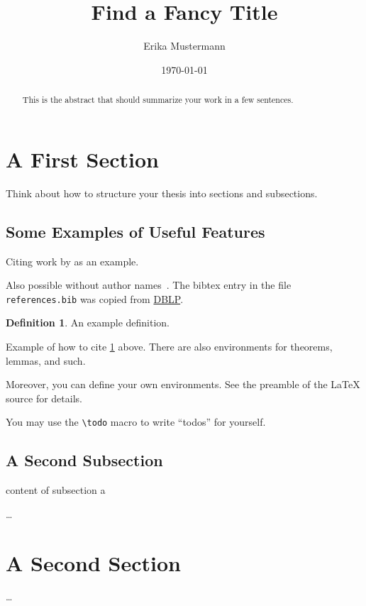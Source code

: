 \documentclass[
	USenglish,
    ]{scrartcl}
\title{Find a Fancy Title}
\author{Erika Mustermann}
\date{\today}
\theoremstyle{plain}
\theoremstyle{definition}
\newtheorem{definition}{Definition}
\theoremstyle{remark}
\begin{document}
\maketitle
\begin{abstract}
	This is the abstract that should summarize your work in a few
	sentences.
\end{abstract}

\tableofcontents

\section{A First Section}

Think about how to structure your thesis into sections and subsections.

\subsection{Some Examples of Useful Features}

Citing work by \textcite{DBLP:books/lib/Knuth97} as an example.

Also possible without author names~\cite{DBLP:books/lib/Knuth97}.
The bibtex entry in the file \texttt{references.bib} was copied from
\href{https://dblp.org/rec/books/lib/Knuth97.html?view=bibtex}{DBLP}.

\begin{definition}%

	\label{def:example}
	An example definition.
\end{definition}

Example of how to cite \cref{def:example} above.
There are also environments for theorems, lemmas, and such.

Moreover, you can define your own environments.
See the preamble of the \LaTeX{} source for details.

You may use the \verb|\todo| macro to write
\enquote{todos} for
yourself.

\subsection{A Second Subsection}
content of subsection a

…

\section{A Second Section}

…

\printbibliography
\end{document}
